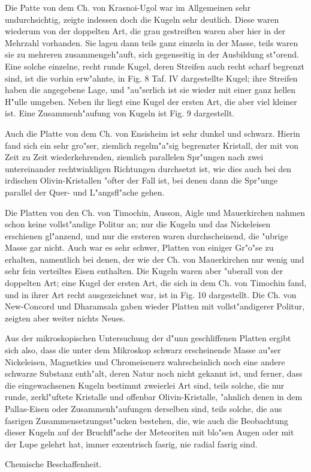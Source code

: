 \documentclass[a4paper, 11pt, oneside]{article}
\begin{document}
Die Patte von dem Ch. von Krasnoi-Ugol war im Allgemeinen sehr undurchsichtig, zeigte indessen doch die Kugeln sehr deutlich. Diese waren wiederum von der doppelten Art, die grau gestreiften waren aber hier in der Mehrzahl vorhanden. Sie lagen dann teils ganz einzeln in der Masse, teils waren sie zu mehreren zusammengeh"auft, sich gegenseitig in der Ausbildung st"orend. Eine solche einzelne, recht runde Kugel, deren Streifen auch recht scharf begrenzt sind, ist die vorhin erw"ahnte, in Fig. 8 Taf. IV dargestellte Kugel; ihre Streifen haben die angegebene Lage, und "au"serlich ist sie wieder mit einer ganz hellen H"ulle umgeben. Neben ihr liegt eine Kugel der ersten Art, die aber viel kleiner ist. Eine Zusammenh"aufung von Kugeln ist Fig. 9 dargestellt.

Auch die Platte von dem Ch. von Ensisheim ist sehr dunkel und schwarz. Hierin fand sich ein sehr gro"ser, ziemlich regelm"a"sig begrenzter Kristall, der mit von Zeit zu Zeit wiederkehrenden, ziemlich parallelen Spr"ungen nach zwei untereinander rechtwinkligen Richtungen durchsetzt ist, wie dies auch bei den irdischen Olivin-Kristallen "ofter der Fall ist, bei denen dann die Spr"unge parallel der Quer- und L"angsfl"ache gehen.

Die Platten von den Ch. von Timochin, Ausson, Aigle und Mauerkirchen nahmen schon keine vollst"andige Politur an; nur die Kugeln und das Nickeleisen erschienen gl"anzend, und nur die ersteren waren durchscheinend, die "ubrige Masse gar nicht. Auch war es sehr schwer, Platten von einiger Gr"o"se zu erhalten, namentlich bei denen, der wie der Ch. von Mauerkirchen nur wenig und sehr fein verteiltes Eisen enthalten. Die Kugeln waren aber "uberall von der doppelten Art; eine Kugel der ersten Art, die sich in dem Ch. von Timochin fand, und in ihrer Art recht ausgezeichnet war, ist in Fig. 10 dargestellt. Die Ch. von New-Concord und Dharamsala gaben wieder Platten mit vollst"andigerer Politur, zeigten aber weiter nichts Neues.

Aus der mikroskopischen Untersuchung der d"unn geschliffenen Platten ergibt sich also, dass die unter dem Mikroskop schwarz erscheinende Masse au"ser Nickeleisen, Magnetkies und Chromeisenerz wahrscheinlich noch eine andere schwarze Substanz enth"alt, deren Natur noch nicht gekannt ist, und ferner, dass die eingewachsenen Kugeln bestimmt zweierlei Art sind, teils solche, die nur runde, zerkl"uftete Kristalle und offenbar Olivin-Kristalle, "ahnlich denen in dem Pallas-Eisen oder Zusammenh"aufungen derselben sind, teils solche, die aus fasrigen Zusammensetzungsst"ucken bestehen, die, wie auch die Beobachtung dieser Kugeln auf der Bruchfl"ache der Meteoriten mit blo"sen Augen oder mit der Lupe gelehrt hat, immer exzentrisch fasrig, nie radial fasrig sind.
\begin{center}
Chemische Beschaffenheit.
\end{center}
\end{document}
